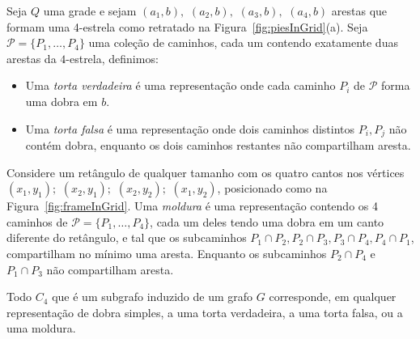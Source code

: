 \begin{definition} \label{defi:tortasFrame}

Seja $ Q $ uma grade e sejam $ (a_1, b),$ $(a_2, b),$ $(a_3, b),$ $(a_4, b)$ arestas que formam uma 4-estrela como retratado na Figura~\ref{fig:piesInGrid}(a). Seja  $ \mathcal{P} = \{P_1, \dots , P_4\}$ uma coleção de caminhos, cada um contendo exatamente duas arestas da $4$-estrela, definimos:

\begin{itemize}
\item Uma \emph{torta verdadeira} é uma representação onde cada caminho $P_i$ de $ \mathcal{P} $ forma uma dobra em $b$.

\item Uma \emph {torta falsa} é uma representação onde dois caminhos distintos $P_i, P_j$  não contém dobra, enquanto os dois caminhos restantes não compartilham aresta. 


%


\end{itemize}
\end{definition}

\begin{definition} \label{defi:tortasFrame2}
 Considere um retângulo de qualquer tamanho com os quatro cantos nos vértices  $ (x_1, y_1);$ $(x_2, y_1);$ $(x_2, y_2);$ $(x_1, y_2)$, posicionado como na Figura~\ref{fig:frameInGrid}. Uma \emph{moldura} é uma representação contendo os 4 caminhos de $\mathcal{P} =  \{ P_1, \dots, P_4\} $, cada um deles tendo uma dobra em um canto diferente do retângulo, e tal que os subcaminhos $ P_1 \cap P_2, P_2 \cap P_3, P_3 \cap P_4, P_4 \cap P_1 $, compartilham no mínimo uma aresta. Enquanto os subcaminhos  $ P_2 \cap P_4 $ e $ P_1 \cap P_3 $ não compartilham aresta.


\end{definition}


%


\begin{lema}\label{lem:representacaoC4}
\cite{golumbic2009} Todo $C_4$ que é um subgrafo induzido de um grafo $ G $ corresponde, em qualquer representação de dobra simples, a uma torta verdadeira, a uma torta falsa, ou a uma moldura.
\end{lema}

